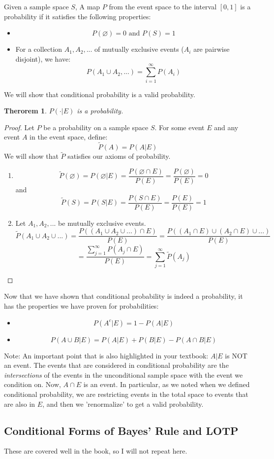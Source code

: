 \documentclass[12pt]{article} %
\newtheorem{thm}{Therorem}
\begin{document}
Given a sample space $S$,
A map $P$ from the event space to the interval $[0,1]$ is a probability if it satisfies the following properties:
\begin{itemize}
\item $$P(\varnothing) = 0 \textrm{ and } P(S) = 1$$
\item For a collection $A_1,A_2,...$ of mutually exclusive events ($A_i$ are pairwise disjoint), we have:
$$P(A_1\cup A_2,...) = \sum_{i=1}^\infty P(A_i)$$
\end{itemize}
We will show that conditional probability is a valid probability.
\begin{thm}
$P(\cdot|E)$ is a probability.
\end{thm}
\begin{proof}
Let $P$ be a probability on a sample space $S$. For some event $E$ and any event $A$ in the event space, define:
$$\tilde{P}(A) = P(A|E)$$
We will show that $\tilde{P}$ satisfies our axioms of probability.
\begin{enumerate}
\item $$\tilde{P}(\varnothing) = P(\varnothing|E) = \frac{P(\varnothing\cap E)}{P(E)} = \frac{P(\varnothing)}{P(E)} = 0$$
and
$$\tilde{P}(S) = P(S|E) = \frac{P(S\cap E)}{P(E)} = \frac{P(E)}{P(E)} = 1$$
\item Let $A_1,A_2,...$ be mutually exclusive events. 
$$\tilde{P}(A_1\cup A_2 \cup ...) = \frac{P\left(\left(A_1\cup A_2 \cup ...\right)\cap E\right)}{P(E)} = \frac{P\left(\left(A_1\cap  E \right)\cup \left(A_2 \cap E\right)\cup ...\right)}{P(E)}$$
$$ = \frac{\sum_{j=1}^\infty P(A_j\cap E)}{P(E)} = \sum_{j=1}^\infty \tilde{P}(A_j)$$
\end{enumerate}
\end{proof}
Now that we have shown that conditional probability is indeed a probability, it has the properties we have proven for probabilities:
\begin{itemize}
\item $$P(A^c|E) = 1- P(A|E)$$
\item $$ P(A\cup B|E) = P(A|E)+ P(B|E) -P(A\cap B|E)$$
\end{itemize}
Note: An important point that is also highlighted in your textbook: $A|E$ is NOT 
an event. The events that are considered in conditional probability are the \emph{intersections} of the events in the unconditional sample space with the event we condition on. Now, $A\cap E$ is an event. In particular, as we noted when we defined conditional probability, we are restricting events in the total space to events that are also in $E$, and then we 'renormalize' to get a valid probability.
\subsection{Conditional Forms of Bayes' Rule and LOTP}
These are covered well in the book, so I will not repeat here. 
\end{document}
